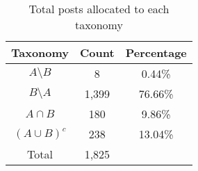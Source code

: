 \begin{table}[tb]
  \caption{Total posts allocated to each taxonomy}
  \label{tab:taxonomy-assignments}
  \begin{tabular}{c||cc}
    \toprule
    \textbf{Taxonomy} & \textbf{Count} & \textbf{Percentage} \\
    \midrule
    $A \setminus B$       & 8        & 0.44\%  \\
    $B \setminus A$       & 1,399    & 76.66\% \\
    $A \cap B$            & 180      & 9.86\%  \\
    $(A \cup B)^{c}$      & 238      & 13.04\% \\
    \midrule
    Total & 1,825 & \\
    \bottomrule
  \end{tabular}
\end{table}